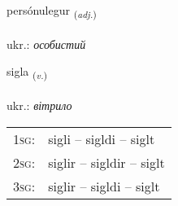 \documentclass[frontgrid, backgrid]{flacards}\usepackage[]{graphicx}\usepackage[]{xcolor}
\begin{document}
\renewcommand{\flhead}{\vskip5pt \fboxsep=0pt {\small\bfseries\footnotesize Lýsingarorð | прикметник}}
\renewcommand{\fcfoot}{\vskip5pt \fboxsep=0pt \hspace{2pt}{\small\bfseries\footnotesize 2K}}

\renewcommand{\blhead}{\vskip5pt {\small\bfseries\footnotesize Lýsingarorð | прикметник }}
\renewcommand{\bcfoot}{\vskip5pt \hspace{2pt}{\small\bfseries\footnotesize 2K}}


{persónulegur \small{\textsubscript{(\textit{adj.})}} \\[1ex] %
 \\
ukr.: \emph{особистий} \\  [2ex]
\renewcommand*{\arraystretch}{0.8}
}

\renewcommand{\flhead}{\vskip5pt \fboxsep=0pt {\small\bfseries\footnotesize Sagnorð | дієслово}}
\renewcommand{\fcfoot}{\vskip5pt \fboxsep=0pt \hspace{2pt}{\small\bfseries\footnotesize 2K}}

\renewcommand{\blhead}{\vskip5pt {\small\bfseries\footnotesize Sagnorð | дієслово }}
\renewcommand{\bcfoot}{\vskip5pt \hspace{2pt}{\small\bfseries\footnotesize 2K}}


{sigla \small{\textsubscript{(\textit{v.})}} \\[1ex] %
\textphonetic{[sɪkla]} \\
ukr.: \emph{вітрило} \\  [2ex]
\renewcommand*{\arraystretch}{0.8}
\begin{tabular}{p{1cm}l}
\textsc{1sg}: & sigli -- sigldi -- siglt \\ 
\textsc{2sg}: & siglir -- sigldir -- siglt \\ 
\textsc{3sg}: & siglir -- sigldi -- siglt \\ 
\end{tabular}
}
\end{document}
